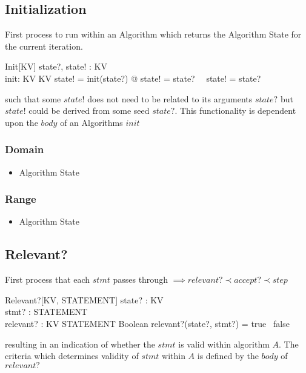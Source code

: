 \documentclass[../main.tex]{subfiles}
\begin{document}
\subsection{Initialization}

First process to run within an Algorithm which returns the Algorithm State for the current iteration.

\begin{schema}{Init[KV]}
  state?, state! : KV \\
  init: KV \fun KV
  \where
  state! = init(state?) @ state! = state? ~\lor ~state! \not = state?
\end{schema}
such that some $state!$ does not need to be related to its arguments $state?$
but $state!$ could be derived from some seed $state?$.
This functionality is dependent upon the $body$ of an Algorithms $init$

\subsubsection{Domain}

\begin{itemize}
\item Algorithm State
\end{itemize}

\subsubsection{Range}

\begin{itemize}
\item Algorithm State
\end{itemize}

\subsection{Relevant?}

First process that each $stmt$ passes through $\implies relevant? \prec accept? \prec step$
\begin{schema}{Relevant?[KV, STATEMENT]}
  state? : KV \\
  stmt? : STATEMENT \\
  relevant? : KV \cross STATEMENT \fun Boolean
  \where
  relevant?(state?, stmt?) = true ~\lor false
\end{schema}
resulting in an indication of whether the $stmt$ is valid within algorithm $A$.
The criteria which determines validity of $stmt$ within $A$ is defined by the $body$ of $relevant?$
\end{document}
